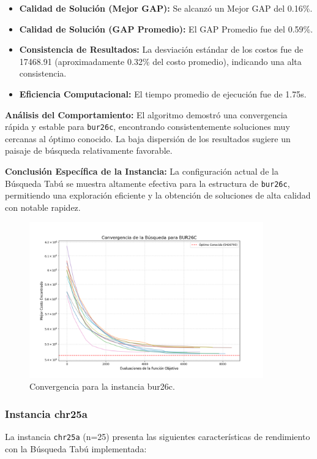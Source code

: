 \documentclass[12pt, a4paper]{article}
\begin{document}
\begin{itemize}
    \item \textbf{Calidad de Solución (Mejor GAP):} Se alcanzó un Mejor GAP del 0.16\%.
    \item \textbf{Calidad de Solución (GAP Promedio):} El GAP Promedio fue del 0.59\%.
    \item \textbf{Consistencia de Resultados:} La desviación estándar de los costos fue de 17468.91 (aproximadamente 0.32\% del costo promedio), indicando una alta consistencia.
    \item \textbf{Eficiencia Computacional:} El tiempo promedio de ejecución fue de 1.75s.
\end{itemize}

\textbf{Análisis del Comportamiento:}
El algoritmo demostró una convergencia rápida y estable para \texttt{bur26c}, encontrando consistentemente soluciones muy cercanas al óptimo conocido. La baja dispersión de los resultados sugiere un paisaje de búsqueda relativamente favorable.

\textbf{Conclusión Específica de la Instancia:}
La configuración actual de la Búsqueda Tabú se muestra altamente efectiva para la estructura de \texttt{bur26c}, permitiendo una exploración eficiente y la obtención de soluciones de alta calidad con notable rapidez.
\begin{figure}[H]
\centering
\includegraphics[width=0.9\textwidth]{../results/graphs/bur26c_convergence.png}
\caption{Convergencia para la instancia bur26c.}
\label{fig:bur26c_conv}
\end{figure}
\newpage
\subsubsection{Instancia chr25a}
La instancia \texttt{chr25a} (n=25) presenta las siguientes características de rendimiento con la Búsqueda Tabú implementada:
\end{document}
